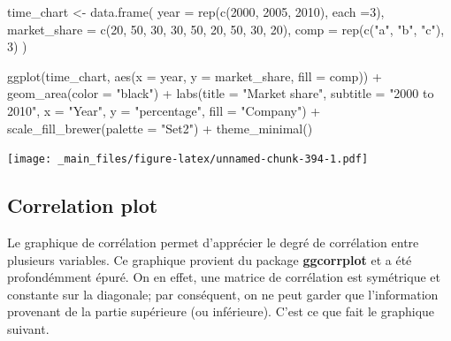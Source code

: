 \documentclass[
]{book}
\newenvironment{Shaded}{\begin{snugshade}}{\end{snugshade}}
\newcommand{\AttributeTok}[1]{\textcolor[rgb]{0.77,0.63,0.00}{#1}}
\newcommand{\DecValTok}[1]{\textcolor[rgb]{0.00,0.00,0.81}{#1}}
\newcommand{\FunctionTok}[1]{\textcolor[rgb]{0.00,0.00,0.00}{#1}}
\newcommand{\NormalTok}[1]{#1}
\newcommand{\OtherTok}[1]{\textcolor[rgb]{0.56,0.35,0.01}{#1}}
\newcommand{\SpecialCharTok}[1]{\textcolor[rgb]{0.00,0.00,0.00}{#1}}
\newcommand{\StringTok}[1]{\textcolor[rgb]{0.31,0.60,0.02}{#1}}
\theoremstyle{definition}
\theoremstyle{definition}
\theoremstyle{definition}
\theoremstyle{definition}
\theoremstyle{remark}
\begin{document}
\begin{Shaded}
\begin{Highlighting}[]
\NormalTok{time\_chart }\OtherTok{\textless{}{-}} \FunctionTok{data.frame}\NormalTok{(}
  \AttributeTok{year =} \FunctionTok{rep}\NormalTok{(}\FunctionTok{c}\NormalTok{(}\DecValTok{2000}\NormalTok{, }\DecValTok{2005}\NormalTok{, }\DecValTok{2010}\NormalTok{), }\AttributeTok{each =}\DecValTok{3}\NormalTok{),}
  \AttributeTok{market\_share =} \FunctionTok{c}\NormalTok{(}\DecValTok{20}\NormalTok{, }\DecValTok{50}\NormalTok{, }\DecValTok{30}\NormalTok{,}
                   \DecValTok{30}\NormalTok{, }\DecValTok{50}\NormalTok{, }\DecValTok{20}\NormalTok{,}
                   \DecValTok{50}\NormalTok{, }\DecValTok{30}\NormalTok{, }\DecValTok{20}\NormalTok{),}
  \AttributeTok{comp =} \FunctionTok{rep}\NormalTok{(}\FunctionTok{c}\NormalTok{(}\StringTok{"a"}\NormalTok{, }\StringTok{"b"}\NormalTok{, }\StringTok{"c"}\NormalTok{), }\DecValTok{3}\NormalTok{)}
\NormalTok{)}

\FunctionTok{ggplot}\NormalTok{(time\_chart, }
  \FunctionTok{aes}\NormalTok{(}\AttributeTok{x =}\NormalTok{ year,}
      \AttributeTok{y =}\NormalTok{ market\_share,}
      \AttributeTok{fill =}\NormalTok{ comp)) }\SpecialCharTok{+}
  \FunctionTok{geom\_area}\NormalTok{(}\AttributeTok{color =} \StringTok{"black"}\NormalTok{) }\SpecialCharTok{+}
  \FunctionTok{labs}\NormalTok{(}\AttributeTok{title =} \StringTok{"Market share"}\NormalTok{,}
       \AttributeTok{subtitle =} \StringTok{"2000 to 2010"}\NormalTok{,}
       \AttributeTok{x =} \StringTok{"Year"}\NormalTok{,}
       \AttributeTok{y =} \StringTok{"percentage"}\NormalTok{,}
       \AttributeTok{fill =} \StringTok{"Company"}\NormalTok{) }\SpecialCharTok{+}
  \FunctionTok{scale\_fill\_brewer}\NormalTok{(}\AttributeTok{palette =} \StringTok{"Set2"}\NormalTok{) }\SpecialCharTok{+}
  \FunctionTok{theme\_minimal}\NormalTok{()}
\end{Highlighting}
\end{Shaded}

\texttt{[image: \_main\_files/figure-latex/unnamed-chunk-394-1.pdf]}

\hypertarget{correlation-plot}{%
\subsection{Correlation plot}\label{correlation-plot}}

Le graphique de corrélation permet d'apprécier le degré de corrélation entre plusieurs variables. Ce graphique provient du package \textbf{ggcorrplot} et a été profondémment épuré. On en effet, une matrice de corrélation est symétrique et constante sur la diagonale; par conséquent, on ne peut garder que l'information provenant de la partie supérieure (ou inférieure). C'est ce que fait le graphique suivant.
\end{document}
